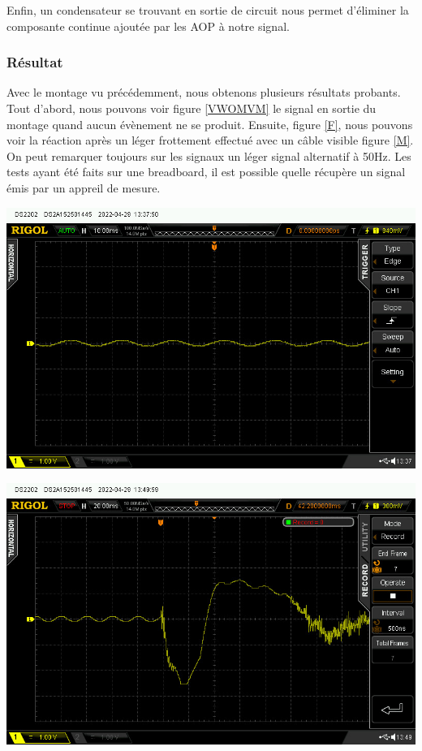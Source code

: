 \documentclass[12pt,french,a4paper]{article}
\begin{document}
Enfin, un condensateur se trouvant en sortie de circuit nous permet d’éliminer la composante continue ajoutée par les AOP à notre signal.


\subsubsection{Résultat}
Avec le montage vu précédemment, nous obtenons plusieurs résultats probants.
Tout d'abord, nous pouvons voir figure \ref{VWOMVM} le signal en sortie du montage quand aucun évènement ne se produit.
Ensuite, figure \ref{F}, nous pouvons voir la réaction après un léger frottement effectué avec un câble visible figure \ref{M}. 
On peut remarquer toujours sur les signaux un léger signal alternatif à 50Hz. Les tests ayant été faits sur une breadboard, il est possible quelle récupère un signal émis par un appreil de mesure.

\begin{center}	
\includegraphics[scale=0.5]{../img/plat.jpg}
\label{VWOMVM}
\end{center}

\begin{center}	
\includegraphics[scale=0.5]{../img/frotment.jpg}
\label{F}
\end{center}
\end{document}
